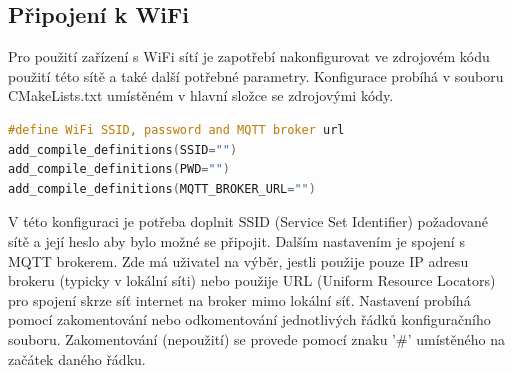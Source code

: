 \subsection{Připojení k WiFi}

Pro použití zařízení s WiFi sítí je zapotřebí nakonfigurovat ve zdrojovém kódu použití této sítě a také další potřebné parametry. Konfigurace probíhá v souboru CMakeLists.txt umístěném v hlavní složce se zdrojovými kódy.

\begin{lstlisting}[language=c, caption={Nastavení spojení pomocí WiFi}]
#define WiFi SSID, password and MQTT broker url
add_compile_definitions(SSID="")
add_compile_definitions(PWD="")
add_compile_definitions(MQTT_BROKER_URL="")
\end{lstlisting}

V této konfiguraci je potřeba doplnit SSID (Service Set Identifier) požadované sítě a její heslo aby bylo možné se připojit. Dalším nastavením je spojení s MQTT brokerem. Zde má uživatel na výběr, jestli použije pouze IP adresu brokeru (typicky v lokální síti) nebo použije URL (Uniform Resource Locators) pro spojení skrze síť internet na broker mimo lokální síť. Nastavení probíhá pomocí zakomentování nebo odkomentování jednotlivých řádků konfiguračního souboru. Zakomentování (nepoužití) se provede pomocí znaku '\#' umístěného na začátek daného řádku.